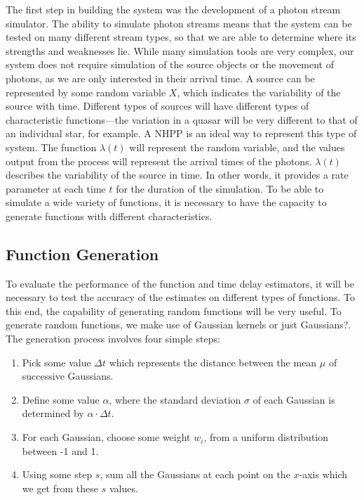 \documentclass[a4paper,11pt]{article}
\begin{document}
The first step in building the system was the development of a photon stream
simulator. The ability to simulate photon streams means that the system can be
tested on many different stream types, so that we are able to determine where
its strengths and weaknesses lie. While many simulation tools are very complex,
our system does not require simulation of the source objects or the movement of
photons, as we are only interested in their arrival time. A source can be
represented by some random variable $X$, which indicates the variability of the
source with time. Different types of sources will have different types of
characteristic functions---the variation in a quasar will be very different to
that of an individual star, for example. A NHPP is an ideal way to represent
this type of system. The function $\lambda(t)$ will represent the random
variable, and the values output from the process will represent the arrival
times of the photons. $\lambda(t)$ describes the variability of the source in
time. In other words, it provides a rate parameter at each time $t$ for the
duration of the simulation. To be able to simulate a wide variety of functions,
it is necessary to have the capacity to generate functions with different
characteristics.
\subsection{Function Generation}
\label{sec-4-1}

To evaluate the performance of the function and time delay estimators, it will
be necessary to test the accuracy of the estimates on different types of
functions. To this end, the capability of generating random functions will be
very useful. To generate random functions, we make use of \large{Gaussian
kernels or just Gaussians?}. The generation process involves four simple steps:
\begin{enumerate}
\item Pick some value $\Delta t$ which represents the distance between the mean
   $\mu$ of successive Gaussians.
\item Define some value $\alpha$, where the standard deviation $\sigma$ of each
   Gaussian is determined by $\alpha\cdot\Delta t$.
\item For each Gaussian, choose some weight $w_i$, from a uniform distribution
   between -1 and 1.
\item Using some step $s$, sum all the Gaussians at each point on the $x$-axis which
   we get from these $s$ values.
\end{enumerate}
\end{document}
